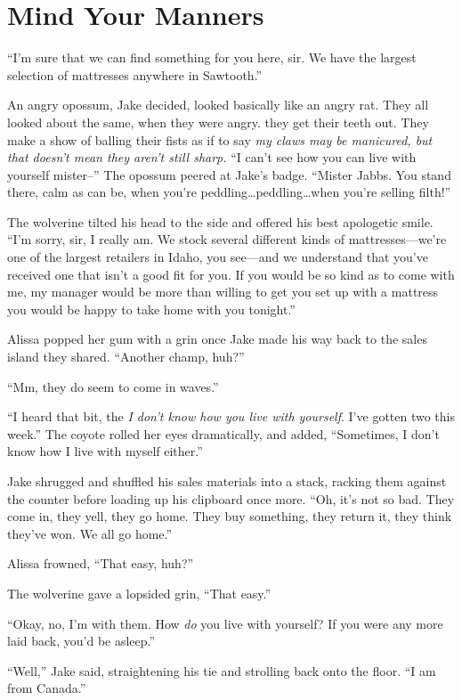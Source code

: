 \hypertarget{mind-your-manners}{%
\chapter{Mind Your Manners}\label{mind-your-manners}}

``I'm sure that we can find something for you here, sir. We have the largest selection of mattresses anywhere in Sawtooth.''

An angry opossum, Jake decided, looked basically like an angry rat. They all looked about the same, when they were angry. they get their teeth out. They make a show of balling their fists as if to say \emph{my claws may be manicured, but that doesn't mean they aren't still sharp.} ``I can't see how you can live with yourself mister--'' The opossum peered at Jake's badge. ``Mister Jabbs. You stand there, calm as can be, when you're peddling\ldots{}peddling\ldots{}when you're selling filth!''

The wolverine tilted his head to the side and offered his best apologetic smile. ``I'm sorry, sir, I really am. We stock several different kinds of mattresses---we're one of the largest retailers in Idaho, you see---and we understand that you've received one that isn't a good fit for you. If you would be so kind as to come with me, my manager would be more than willing to get you set up with a mattress you would be happy to take home with you tonight.''

Alissa popped her gum with a grin once Jake made his way back to the sales island they shared. ``Another champ, huh?''

``Mm, they do seem to come in waves.''

``I heard that bit, the \emph{I don't know how you live with yourself}. I've gotten two this week.'' The coyote rolled her eyes dramatically, and added, ``Sometimes, I don't know how I live with myself either.''

Jake shrugged and shuffled his sales materials into a stack, racking them against the counter before loading up his clipboard once more. ``Oh, it's not so bad. They come in, they yell, they go home. They buy something, they return it, they think they've won. We all go home.''

Alissa frowned, ``That easy, huh?''

The wolverine gave a lopsided grin, ``That easy.''

``Okay, no, I'm with them. How \emph{do} you live with yourself? If you were any more laid back, you'd be asleep.''

``Well,'' Jake said, straightening his tie and strolling back onto the floor. ``I am from Canada.''

